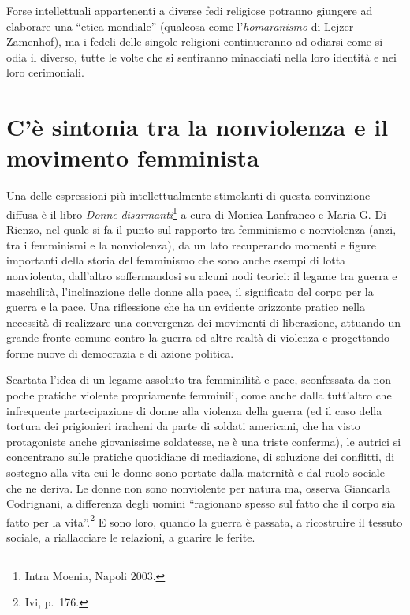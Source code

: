 \documentclass[12pt,oneside,openany]{book}
\begin{document}
Forse intellettuali appartenenti a diverse fedi religiose potranno giungere ad elaborare una ``etica mondiale'' (qualcosa come l'\emph{homaranismo} di Lejzer Zamenhof), ma i fedeli delle singole religioni continueranno ad odiarsi come si odia il diverso, tutte le volte che si sentiranno minacciati nella loro identità e nei loro cerimoniali.

\setcounter{chapter}{6}\addtocounter{chapter}{-1}

\chapter{C’è sintonia tra la nonviolenza e il movimento femminista}

Una delle espressioni più intellettualmente stimolanti di questa convinzione diffusa è il libro \emph{Donne} \emph{disarmanti}\footnote{Intra Moenia, Napoli 2003.} a cura di Monica Lanfranco e Maria G. Di Rienzo, nel quale si fa il punto sul rapporto tra femminismo e nonviolenza (anzi, tra i femminismi e la nonviolenza), da un lato recuperando momenti e figure importanti della storia del femminismo che sono anche esempi di lotta nonviolenta, dall'altro soffermandosi su alcuni nodi teorici: il legame tra guerra e maschilità, l'inclinazione delle donne alla pace, il significato del corpo per la guerra e la pace. Una riflessione che ha un evidente orizzonte pratico nella necessità di realizzare una convergenza dei movimenti di liberazione, attuando un grande fronte comune contro la guerra ed altre realtà di violenza e progettando forme nuove di democrazia e di azione politica.



Scartata l'idea di un legame assoluto tra femminilità e pace, sconfessata da non poche pratiche violente propriamente femminili, come anche dalla tutt'altro che infrequente partecipazione di donne alla violenza della guerra (ed il caso della tortura dei prigionieri iracheni da parte di soldati americani, che ha visto protagoniste anche giovanissime soldatesse, ne è una triste conferma), le autrici si concentrano sulle pratiche quotidiane di mediazione, di soluzione dei conflitti, di sostegno alla vita cui le donne sono portate dalla maternità e dal ruolo sociale che ne deriva. Le donne non sono nonviolente per natura ma, osserva Giancarla Codrignani, a differenza degli uomini ``ragionano spesso sul fatto che il corpo sia fatto per la vita''.\footnote{Ivi, p.~176.} E sono loro, quando la guerra è passata, a ricostruire il tessuto sociale, a riallacciare le relazioni, a guarire le ferite.
\end{document}
